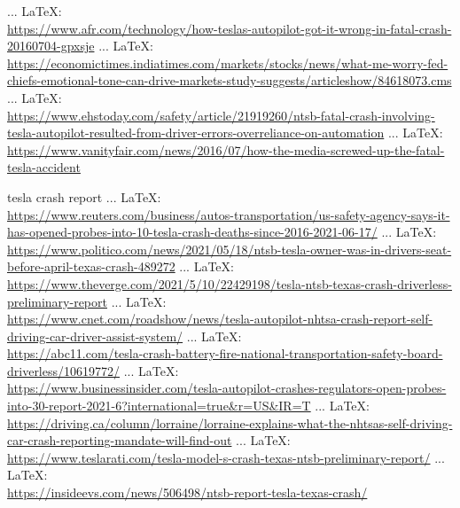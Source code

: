 \begin{thebibliography}{99}
{ ... \LaTeX:\\ \url{https://www.afr.com/technology/how-teslas-autopilot-got-it-wrong-in-fatal-crash-20160704-gpxsje}
 ... \LaTeX:\\ \url{https://economictimes.indiatimes.com/markets/stocks/news/what-me-worry-fed-chiefs-emotional-tone-can-drive-markets-study-suggests/articleshow/84618073.cms}
 ... \LaTeX:\\ \url{https://www.ehstoday.com/safety/article/21919260/ntsb-fatal-crash-involving-tesla-autopilot-resulted-from-driver-errors-overreliance-on-automation}
 ... \LaTeX:\\ \url{https://www.vanityfair.com/news/2016/07/how-the-media-screwed-up-the-fatal-tesla-accident}


tesla crash report
 ... \LaTeX:\\ \url{https://www.reuters.com/business/autos-transportation/us-safety-agency-says-it-has-opened-probes-into-10-tesla-crash-deaths-since-2016-2021-06-17/}
 ... \LaTeX:\\ \url{https://www.politico.com/news/2021/05/18/ntsb-tesla-owner-was-in-drivers-seat-before-april-texas-crash-489272}
 ... \LaTeX:\\ \url{https://www.theverge.com/2021/5/10/22429198/tesla-ntsb-texas-crash-driverless-preliminary-report}
 ... \LaTeX:\\ \url{https://www.cnet.com/roadshow/news/tesla-autopilot-nhtsa-crash-report-self-driving-car-driver-assist-system/}
 ... \LaTeX:\\ \url{https://abc11.com/tesla-crash-battery-fire-national-transportation-safety-board-driverless/10619772/}
 ... \LaTeX:\\ \url{https://www.businessinsider.com/tesla-autopilot-crashes-regulators-open-probes-into-30-report-2021-6?international=true&r=US&IR=T}
 ... \LaTeX:\\ \url{https://driving.ca/column/lorraine/lorraine-explains-what-the-nhtsas-self-driving-car-crash-reporting-mandate-will-find-out}
 ... \LaTeX:\\ \url{https://www.teslarati.com/tesla-model-s-crash-texas-ntsb-preliminary-report/}
 ... \LaTeX:\\ \url{https://insideevs.com/news/506498/ntsb-report-tesla-texas-crash/}
}
\end{thebibliography}
